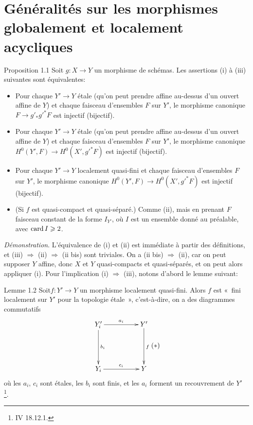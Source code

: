 \documentclass[10pt]{../fichiers-configuration-latex/smfart}
\begin{document}
\section{Généralités sur les morphismes globalement et localement
  acycliques}\pageoriginale


\begin{enonce*}{Proposition 1.1}
Soit $g:X\rightarrow Y$ un morphisme de schémas. Les assertions
{\rm(i)} à {\rm(iii)} suivantes sont équivalentes:
\begin{itemize}
\item[(i)] Pour chaque $Y'\rightarrow Y$ étale (qu'on peut prendre affine
  au-dessus d'un ouvert affine de $Y$) et chaque faisceau d'ensembles
  $F$ sur $Y'$, le morphisme canonique $F\rightarrow
  g'_{\ast}{g'}^{\ast}F$ est injectif (\resp bijectif).

\item[(ii)] Pour chaque $Y'\rightarrow Y$ étale (qu'on peut prendre affine
  au-dessus d'un ouvert affine de $Y$) et chaque faisceau d'ensembles
  $F$ sur $Y'$, le morphisme canonique $H^{0}(Y',F)\rightarrow
  H^{0}(X',{g'}^{\ast}F)$ est injectif (\resp bijectif).

\item[(iii)] Pour chaque $Y'\rightarrow Y$ localement quasi-fini et
  chaque faisceau d'ensembles $F$ sur $Y'$, le morphisme canonique
  $H^{0}(Y',F)\rightarrow H^{0}(X',{g'}^{\ast}F)$ est injectif
  (\resp bijectif).

\item[(ii bis)] (Si $f$ est quasi-compact et quasi-séparé.) Comme
  {\rm(ii)}, mais en prenant $F$ faisceau constant de la forme
  $I_{Y'}$, où $I$ est un ensemble donné au préalable, avec $\operatorname{card}
  I\geqslant 2$.
\end{itemize}
\end{enonce*}

\noindent
\emph{Démonstration}. L'équivalence de (i) et (ii) est immédiate à
partir des définitions, et (iii) $\Rightarrow$ (ii) $\Rightarrow$ (ii
bis) sont triviales. On a (ii bis) $\Rightarrow$ (ii), car on peut
supposer $Y$ affine, donc $X$ et $Y$ quasi-compacts et quasi-séparés,
et on peut alors appliquer  (i). Pour l'implication (i)
$\Rightarrow$ (iii), notons d'abord le lemme suivant:

\begin{enonce*}{Lemme 1.2}
Soit\pageoriginale $f:Y'\rightarrow Y$ un morphisme localement
quasi-fini. Alors $f$ est « fini localement sur $Y'$ pour la
topologie étale », c'est-à-dire, on a des diagrammes commutatifs
$$\vcenter{
\xymatrix@=1.75cm{
Y'_i        \ar[r]^{a_i}   \ar[d]^{b_i}& Y'\ar[d]^{f}\\
Y_i          \ar[r]^{c_i}              & Y
}}\leqno{(*)}
$$
où les $a_i$, $c_i$ sont étales, les $b_i$ sont finis, et les $a_i$
forment un recouvrement de $Y'$ \footnote[1]{\Cf \EGA IV 18.12.1.}.
\end{enonce*}
\end{document}
